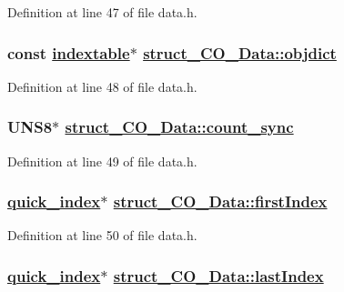 Definition at line 47 of file data.h.\hypertarget{structstruct__CO__Data_a766a4db603786bffdd609817048ef04}{
\subsubsection[objdict]{\setlength{\rightskip}{0pt plus 5cm}const \hyperlink{structtd__indextable}{indextable}$\ast$ \hyperlink{structstruct__CO__Data_a766a4db603786bffdd609817048ef04}{struct\_\-CO\_\-Data::objdict}}}
\label{structstruct__CO__Data_a766a4db603786bffdd609817048ef04}




Definition at line 48 of file data.h.\hypertarget{structstruct__CO__Data_83ae82d4401e78e3fd3a1ed5d457ade7}{
\subsubsection[count\_\-sync]{\setlength{\rightskip}{0pt plus 5cm}UNS8$\ast$ \hyperlink{structstruct__CO__Data_83ae82d4401e78e3fd3a1ed5d457ade7}{struct\_\-CO\_\-Data::count\_\-sync}}}
\label{structstruct__CO__Data_83ae82d4401e78e3fd3a1ed5d457ade7}




Definition at line 49 of file data.h.\hypertarget{structstruct__CO__Data_f26b0fce2ed684c5983aa658efd6c52e}{
\subsubsection[firstIndex]{\setlength{\rightskip}{0pt plus 5cm}\hyperlink{structs__quick__index}{quick\_\-index}$\ast$ \hyperlink{structstruct__CO__Data_f26b0fce2ed684c5983aa658efd6c52e}{struct\_\-CO\_\-Data::first\-Index}}}
\label{structstruct__CO__Data_f26b0fce2ed684c5983aa658efd6c52e}




Definition at line 50 of file data.h.\hypertarget{structstruct__CO__Data_96d334a4fc8c304826b053681ccbf0d1}{
\subsubsection[lastIndex]{\setlength{\rightskip}{0pt plus 5cm}\hyperlink{structs__quick__index}{quick\_\-index}$\ast$ \hyperlink{structstruct__CO__Data_96d334a4fc8c304826b053681ccbf0d1}{struct\_\-CO\_\-Data::last\-Index}}}
\label{structstruct__CO__Data_96d334a4fc8c304826b053681ccbf0d1}





